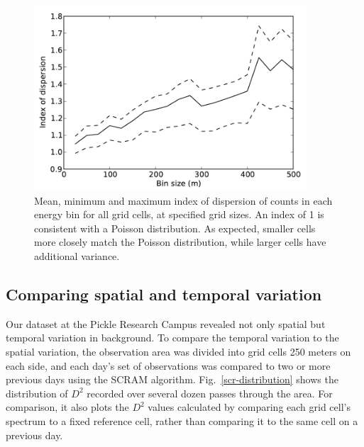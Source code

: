 \begin{figure}
  \centering
  \includegraphics[width=4in]{figures/poisson-dispersion.pdf}
  \caption{Mean, minimum and maximum index of dispersion of counts in each
    energy bin for all grid cells, at specified grid sizes. An index of 1 is
    consistent with a Poisson distribution.  As expected, smaller cells more
    closely match the Poisson distribution, while larger cells have additional
    variance.}
  \label{poisson-dispersion}
\end{figure}

\subsection{Comparing spatial and temporal variation}

Our dataset at the Pickle Research Campus revealed not only spatial but temporal
variation in background. To compare the temporal variation to the spatial
variation, the observation area was divided into grid cells 250 meters on each
side, and each day's set of observations was compared to two or more previous
days using the SCRAM algorithm. Fig.\ \ref{scr-distribution} shows the
distribution of \(D^2\) recorded over several dozen passes through the area. For
comparison, it also plots the \(D^2\) values calculated by comparing each grid
cell's spectrum to a fixed reference cell, rather than comparing it to the same
cell on a previous day.


